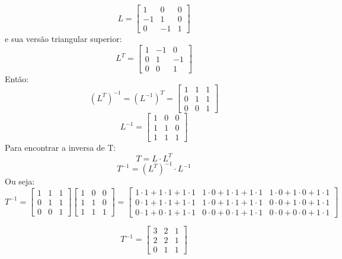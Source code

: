 \documentclass[leqno]{article}
\begin{document}
\begin{enumerate}
		\begin{sol} 
			$$L = \begin{bmatrix}
				1 & 0 & 0\\
				-1 & 1 & 0\\
				0 & -1 & 1
			\end{bmatrix}$$
		e sua versão triangular superior:
			$$L^T = \begin{bmatrix}
				1 & -1 & 0\\
				0 & 1 & -1\\
				0 & 0 & 1
			\end{bmatrix}$$
		Então:
			$$(L^T)^{-1} = (L^{-1})^{T} = \begin{bmatrix}
				1 & 1 & 1\\
				0 & 1 & 1\\
				0 & 0 & 1
			\end{bmatrix}$$
		\newline
			$$L^{-1} = \begin{bmatrix}
				1 & 0 & 0\\
				1 & 1 & 0\\
				1 & 1 & 1
			\end{bmatrix}$$
		Para encontrar a inversa de T:
		$$T = L \cdot L^T$$
		$$T^{-1} = (L^T)^{-1} \cdot L^{-1}$$
		Ou seja:
		$$T^{-1} = \begin{bmatrix}
			1 & 1 & 1\\
			0 & 1 & 1\\
			0 & 0 & 1
		\end{bmatrix}
		\begin{bmatrix}
			1 & 0 & 0\\
			1 & 1 & 0\\
			1 & 1 & 1
		\end{bmatrix} =
		\begin{bmatrix}
			1 \cdot 1 + 1 \cdot 1 + 1 \cdot 1 & 1 \cdot 0 + 1 \cdot 1 + 1 \cdot 1 & 1 \cdot 0 + 1 \cdot 0 + 1 \cdot 1\\
			0 \cdot 1 + 1 \cdot 1 + 1 \cdot 1 & 1 \cdot 0 + 1 \cdot 1 + 1 \cdot 1 & 0 \cdot 0 + 1 \cdot 0 + 1 \cdot 1\\
			0 \cdot 1 + 0 \cdot 1 + 1 \cdot 1 & 0 \cdot 0 + 0 \cdot 1 + 1 \cdot 1 & 0 \cdot 0 + 0 \cdot 0 + 1 \cdot 1
		\end{bmatrix}$$
		
		$$T^{-1} = \begin{bmatrix}
			3 & 2 & 1\\
			2 & 2 & 1\\
			0 & 1 & 1
		\end{bmatrix}$$
		

\end{sol}
\end{enumerate}
\end{document}
